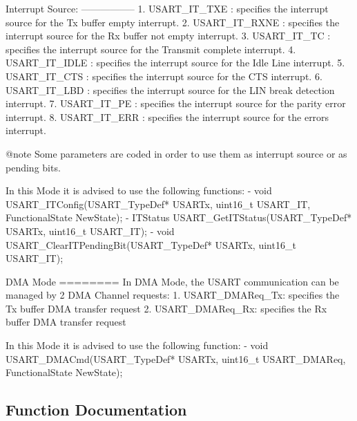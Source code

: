 \begin{DoxyVerb}
  Interrupt Source:
  -----------------
     1. USART_IT_TXE : specifies the interrupt source for the Tx buffer empty 
                       interrupt. 
     2. USART_IT_RXNE : specifies the interrupt source for the Rx buffer not 
                        empty interrupt.
     3. USART_IT_TC : specifies the interrupt source for the Transmit complete 
                       interrupt. 
     4. USART_IT_IDLE : specifies the interrupt source for the Idle Line interrupt.             
     5. USART_IT_CTS : specifies the interrupt source for the CTS interrupt. 
     6. USART_IT_LBD : specifies the interrupt source for the LIN break detection
                       interrupt. 
     7. USART_IT_PE : specifies the interrupt source for the parity error interrupt. 
     8. USART_IT_ERR :  specifies the interrupt source for the errors interrupt.

@note Some parameters are coded in order to use them as interrupt source or as pending bits.

  In this Mode it is advised to use the following functions:
     - void USART_ITConfig(USART_TypeDef* USARTx, uint16_t USART_IT, FunctionalState NewState);
     - ITStatus USART_GetITStatus(USART_TypeDef* USARTx, uint16_t USART_IT);
     - void USART_ClearITPendingBit(USART_TypeDef* USARTx, uint16_t USART_IT);

  DMA Mode
  ========
  In DMA Mode, the USART communication can be managed by 2 DMA Channel requests:
     1. USART_DMAReq_Tx: specifies the Tx buffer DMA transfer request
     2. USART_DMAReq_Rx: specifies the Rx buffer DMA transfer request

  In this Mode it is advised to use the following function:
     - void USART_DMACmd(USART_TypeDef* USARTx, uint16_t USART_DMAReq, FunctionalState NewState);\end{DoxyVerb}
 

\subsection{Function Documentation}

